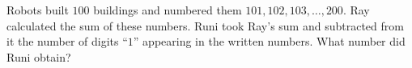 Robots built $100$ buildings and numbered them $101, 102 ,103, \ldots, 200$. Ray calculated the sum of these numbers. Runi took Ray's sum and subtracted from it the number of digits ``$1$'' appearing in the written numbers. What number did Runi obtain?
